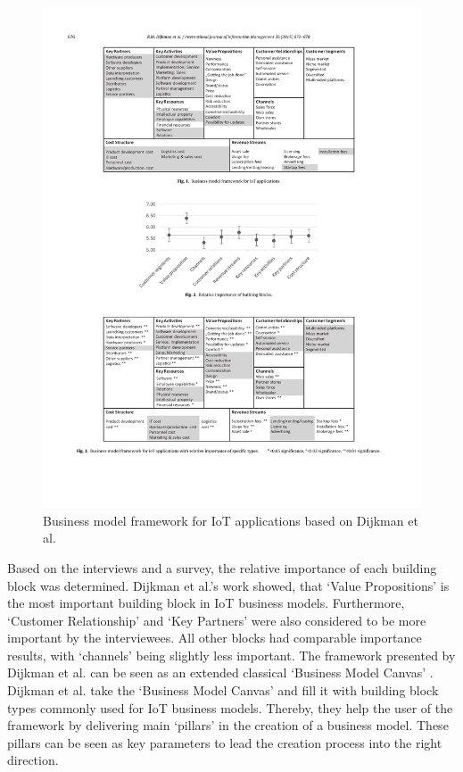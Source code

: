 		\begin{figure}[ht]
			\begin{center}
		    \includegraphics[scale=1.1]{Talk11/iot_canvas_dijkman.pdf}
		    \end{center}
		    \caption{Business model framework for IoT applications based on Dijkman et al. \cite{dijkman}}
		    \label{fig:bm_dijkman}
		\end{figure}

		Based on the interviews and a survey, the relative importance of each building block was determined. Dijkman et al.'s work showed, that `Value Propositions' is the most important building block in IoT business models. Furthermore, `Customer Relationship' and `Key Partners' were also considered to be more important by the interviewees. All other blocks had comparable importance results, with `channels' being slightly less important. The framework presented by Dijkman et al. can be seen as an extended classical `Business Model Canvas' \cite{bmc}. Dijkman et al. take the `Business Model Canvas' and fill it with building block types commonly used for IoT business models. Thereby, they help the user of the framework by delivering main `pillars' in the creation of a business model. These pillars can be seen as key parameters to lead the creation process into the right direction. 

